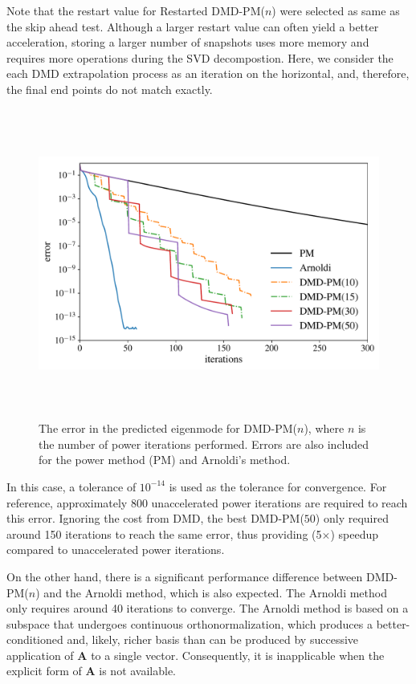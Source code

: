 Note that the restart value for Restarted DMD-PM($n$) were selected as same as the skip ahead test.
Although a larger restart value can often yield a better acceleration, storing a larger number of snapshots uses more memory and requires more operations during the SVD decompostion.
Here, we consider the each DMD extrapolation process as an iteration on the horizontal, and, therefore, the final end points do not match exactly.

\begin{figure}[htb]%
    \centering
    \includegraphics[height=4.0in]{tex/figures/dmdpi_semilog.pdf}
    \caption{The error in the predicted eigenmode for DMD-PM($n$), where $n$ is the number of power iterations performed.  Errors are also included for the power method (PM) and Arnoldi's method.}
    \label{fig:dmdpi_semilog}
\end{figure}

In this case, a tolerance of $10^{-14}$ is used as the tolerance for convergence.
For reference, approximately 800 unaccelerated power iterations are required to reach this error.
Ignoring the cost from DMD, the best DMD-PM($50$) only required around 150 iterations to reach the same error, thus providing (5$\times$) speedup compared to unaccelerated power iterations.

On the other hand, there is a significant performance difference between DMD-PM($n$) and the Arnoldi method, which is also expected.
The Arnoldi method only requires around 40 iterations to converge.
The Arnoldi method is based on a subspace that undergoes continuous orthonormalization, which produces a better-conditioned and, likely, richer basis than can be produced by successive application of $\mathbf{A}$ to a single vector.
Consequently, it is inapplicable when the explicit form of $\mathbf{A}$ is not available.  

